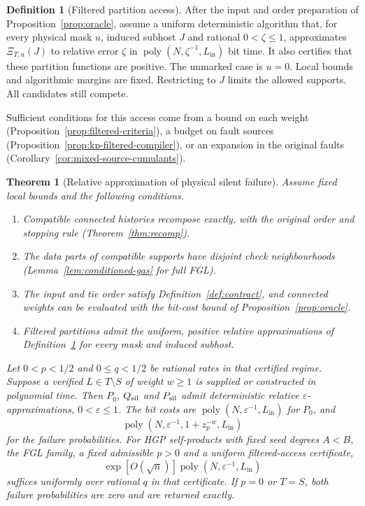 \documentclass[10pt,twocolumn]{article}
\newtheorem{theorem}{Theorem}
\theoremstyle{definition}
\newtheorem{definition}{Definition}
\DeclareMathOperator{\poly}{poly}
\newcommand{\Lin}{L_{\mathrm{in}}}
\begin{document}
\begin{definition}[Filtered partition access]\label{def:filtered-access}
After the input and order preparation of Proposition~\ref{prop:oracle},
assume a uniform deterministic algorithm that, for every physical mask
$u$, induced subhost $J$ and rational $0<\zeta\le1$, approximates
$\Xi_{T,u}(J)$ to relative error $\zeta$ in
$\poly(N,\zeta^{-1},\Lin)$ bit time. It also certifies that these
partition functions are positive. The unmarked case is $u=0$.
Local bounds and algorithmic margins are fixed. Restricting to $J$
limits the allowed supports. All candidates still compete.
\end{definition}
Sufficient conditions for this access come from a bound on each weight
(Proposition~\ref{prop:filtered-criteria}), a budget on fault sources
(Proposition~\ref{prop:kp-filtered-compiler}), or an expansion in the
original faults (Corollary~\ref{cor:mixed-source-cumulants}).

\begin{theorem}[Relative approximation of physical silent failure]\label{thm:silent-conditioned}
Assume fixed local bounds and the following conditions.
\begin{enumerate}
\setlength{\itemsep}{1pt}
\item[(i)] Compatible connected histories recompose exactly, with the
original order and stopping rule (Theorem~\ref{thm:recomp}).
\item[(ii)] The data parts of compatible supports have disjoint
check neighbourhoods (Lemma~\ref{lem:conditioned-gas} for full FGL).
\item[(iii)] The input and tie order satisfy Definition~\ref{def:contract},
and connected weights can be evaluated with the bit-cost bound of
Proposition~\ref{prop:oracle}.
\item[(iv)] Filtered partitions admit the uniform, positive relative
approximations of Definition~\ref{def:filtered-access} for every
mask and induced subhost.
\end{enumerate}
Let $0<p<1/2$ and $0\le q<1/2$ be rational rates in that certified regime.
Suppose a verified $L\in T\setminus S$ of weight $w\ge1$ is supplied
or constructed in polynomial time. Then $P_0$, $Q_{\rm sil}$ and
$P_{\rm sil}$ admit deterministic relative $\varepsilon$-approximations,
$0<\varepsilon\le1$. The bit costs are
$\poly(N,\varepsilon^{-1},\Lin)$ for $P_0$, and
\begin{equation}\label{eq:silent-modular-cost}
 \poly(N,\varepsilon^{-1},1+z_p^{-w},\Lin)
\end{equation}
for the failure probabilities.
For HGP self-products with fixed seed degrees $A<B$, the FGL family,
a fixed admissible $p>0$ and a uniform filtered-access certificate,
\begin{equation}\label{eq:silent-hgp-cost}
 \exp[O(\sqrt n)]\poly(N,\varepsilon^{-1},\Lin)
\end{equation}
suffices uniformly over rational $q$ in that certificate.
If $p=0$ or $T=S$, both failure probabilities are zero and are returned
exactly.
\end{theorem}
\end{document}
